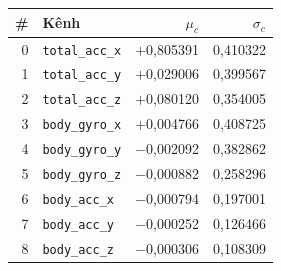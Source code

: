 \begin{tabular}{rlrr}
\toprule
\# & Kênh & $\mu_c$ & $\sigma_c$ \\
\midrule
0 & \texttt{total\_acc\_x} & $+$0,805391 & 0,410322 \\
1 & \texttt{total\_acc\_y} & $+$0,029006 & 0,399567 \\
2 & \texttt{total\_acc\_z} & $+$0,080120 & 0,354005 \\
3 & \texttt{body\_gyro\_x} & $+$0,004766 & 0,408725 \\
4 & \texttt{body\_gyro\_y} & $-$0,002092 & 0,382862 \\
5 & \texttt{body\_gyro\_z} & $-$0,000882 & 0,258296 \\
6 & \texttt{body\_acc\_x} & $-$0,000794 & 0,197001 \\
7 & \texttt{body\_acc\_y} & $-$0,000252 & 0,126466 \\
8 & \texttt{body\_acc\_z} & $-$0,000306 & 0,108309 \\
\bottomrule
\end{tabular}
